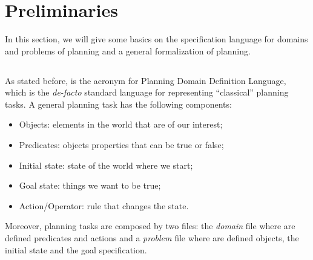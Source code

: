 \section{Preliminaries}
In this section, we will give some basics on the \PDDL specification language for domains and problems of planning and a general formalization of \FOND planning.
\subsection{\PDDL}\label{sec:pddl}
As stated before, \PDDL is the acronym for Planning Domain Definition Language, which is the \textit{de-facto} standard language for representing ``classical'' planning tasks. A general planning task has the following components:
\begin{itemize}
\item Objects: elements in the world that are of our interest;
\item Predicates: objects properties that can be true or false;
\item Initial state: state of the world where we start;
\item Goal state: things we want to be true;
\item Action/Operator: rule that changes the state. 
\end{itemize}
Moreover, planning tasks are composed by two files: the \textit{domain} file where are defined predicates and actions and a \textit{problem} file where are defined objects, the initial state and the goal specification.
